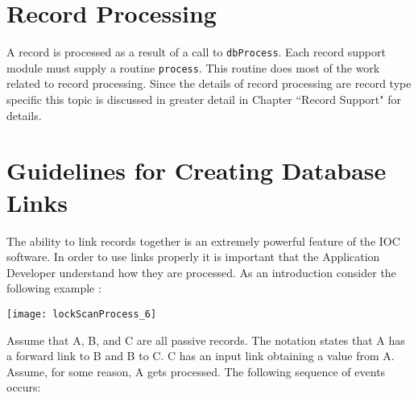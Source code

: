 \section{Record Processing}

A record is processed as a result of a call to \verb|dbProcess|. Each record support module must supply a routine \verb|process|. 
This routine does most of the work related to record processing. Since the details of record processing are record type 
specific this topic is discussed in greater detail in Chapter ``Record Support" for details.

\section{Guidelines for Creating Database Links}

The ability to link records together is an extremely powerful feature of the IOC software. In order to use links properly it 
is important that the Application Developer understand how they are processed. As an introduction consider the following 
example :

\begin{center}
\texttt{[image: lockScanProcess\_6]}
\end{center}

Assume that A, B, and C are all passive records. The notation states that A has a forward link to B and B to C. C has an 
input link obtaining a value from A. Assume, for some reason, A gets processed. The following sequence of events 
occurs:

